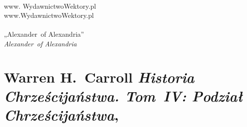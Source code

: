 \documentclass[a4paper,11pt]{article}
\begin{document}
\VerSpaceSix


\noindent
{} \\
\Jest  www. WydawnictwoWektory.pl \\
\Powin www.WydawnictwoWektory.pl \\
 \\
\Jest  „Alexander~of Alexandria” \\
\Powin \textit{Alexander~of Alexandria} \\













\section{Warren H.~Carroll \textit{Historia Chrześcijaństwa.
    Tom~IV: Podział Chrześcijaństwa},
  \cite{CarrollHistoriaChrzecijanstwaVolIV2011}}






\newpage

\end{document}
